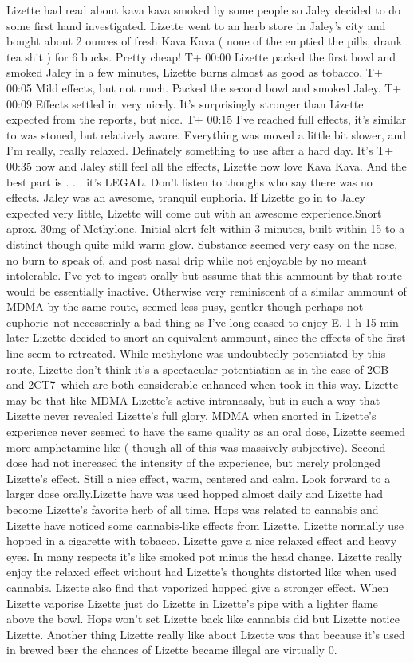 \documentclass[12pt]{book}
\begin{document}
Lizette had read about kava kava smoked by some people so Jaley decided to do some first hand investigated. Lizette went to an herb store in Jaley's city and bought about 2 ounces of fresh Kava Kava ( none of the emptied the pills, drank tea shit ) for 6 bucks. Pretty cheap! T+ 00:00 Lizette packed the first bowl and smoked Jaley in a few minutes, Lizette burns almost as good as tobacco. T+ 00:05 Mild effects, but not much. Packed the second bowl and smoked Jaley. T+ 00:09 Effects settled in very nicely. It's surprisingly stronger than Lizette expected from the reports, but nice. T+ 00:15 I've reached full effects, it's similar to was stoned, but relatively aware. Everything was moved a little bit slower, and I'm really, really relaxed. Definately something to use after a hard day. It's T+ 00:35 now and Jaley still feel all the effects, Lizette now love Kava Kava. And the best part is . . .  it's LEGAL. Don't listen to thoughs who say there was no effects. Jaley was an awesome, tranquil euphoria. If Lizette go in to Jaley expected very little, Lizette will come out with an awesome experience.Snort aprox. 30mg of Methylone. Initial alert felt within 3 minutes, built within 15 to a distinct though quite mild warm glow. Substance seemed very easy on the nose, no burn to speak of, and post nasal drip while not enjoyable by no meant intolerable. I've yet to ingest orally but assume that this ammount by that route would be essentially inactive. Otherwise very reminiscent of a similar ammount of MDMA by the same route, seemed less pusy, gentler though perhaps not euphoric--not necesserialy a bad thing as I've long ceased to enjoy E. 1 h 15 min later Lizette decided to snort an equivalent ammount, since the effects of the first line seem to retreated. While methylone was undoubtedly potentiated by this route, Lizette don't think it's a spectacular potentiation as in the case of 2CB and 2CT7--which are both considerable enhanced when took in this way. Lizette may be that like MDMA Lizette's active intranasaly, but in such a way that Lizette never revealed Lizette's full glory. MDMA when snorted in Lizette's experience never seemed to have the same quality as an oral dose, Lizette seemed more amphetamine like ( though all of this was massively subjective). Second dose had not increased the intensity of the experience, but merely prolonged Lizette's effect. Still a nice effect, warm, centered and calm. Look forward to a larger dose orally.Lizette have was used hopped almost daily and Lizette had become Lizette's favorite herb of all time. Hops was related to cannabis and Lizette have noticed some cannabis-like effects from Lizette. Lizette normally use hopped in a cigarette with tobacco. Lizette gave a nice relaxed effect and heavy eyes. In many respects it's like smoked pot minus the head change. Lizette really enjoy the relaxed effect without had Lizette's thoughts distorted like when used cannabis. Lizette also find that vaporized hopped give a stronger effect. When Lizette vaporise Lizette just do Lizette in Lizette's pipe with a lighter flame above the bowl. Hops won't set Lizette back like cannabis did but Lizette notice Lizette. Another thing Lizette really like about Lizette was that because it's used in brewed beer the chances of Lizette became illegal are virtually 0. 
\end{document}
